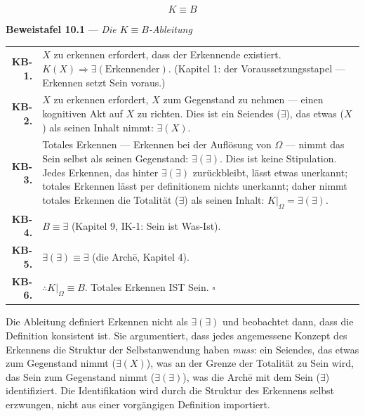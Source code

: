 \documentclass[10pt, openany, oneside]{book}
\renewcommand{\footnotesize}{\fontsize{8.5}{11}\selectfont}
\begin{document}
$$\boxed{K \equiv B}$$

\vspace{0.5em}

\textbf{Beweistafel 10.1} --- \textit{Die $K \equiv B$-Ableitung}

\vspace{0.5em}

{\footnotesize
\noindent\begin{tabular}{r p{}}
\textbf{KB-1.} & $X$ zu erkennen erfordert, dass der Erkennende existiert. $K(X) \Rightarrow \exists(\text{Erkennender})$. (Kapitel 1: der Voraussetzungsstapel --- Erkennen setzt Sein voraus.) \\[0.3em]
\textbf{KB-2.} & $X$ zu erkennen erfordert, $X$ zum Gegenstand zu nehmen --- einen kognitiven Akt auf $X$ zu richten. Dies ist ein Seiendes ($\exists$), das etwas ($X$) als seinen Inhalt nimmt: $\exists(X)$. \\[0.3em]
\textbf{KB-3.} & Totales Erkennen --- Erkennen bei der Auflösung von $\Omega$ --- nimmt das Sein selbst als seinen Gegenstand: $\exists(\exists)$. Dies ist keine Stipulation. Jedes Erkennen, das hinter $\exists(\exists)$ zurückbleibt, lässt etwas unerkannt; totales Erkennen lässt per definitionem nichts unerkannt; daher nimmt totales Erkennen die Totalität ($\exists$) als seinen Inhalt: $K|_{\Omega} = \exists(\exists)$. \\[0.3em]
\textbf{KB-4.} & $B \equiv \exists$ (Kapitel 9, IK-1: Sein ist Was-Ist). \\[0.3em]
\textbf{KB-5.} & $\exists(\exists) \equiv \exists$ (die Arch\={e}, Kapitel 4). \\[0.3em]
\textbf{KB-6.} & $\therefore K|_{\Omega} \equiv B$. Totales Erkennen IST Sein. $\square$ \\[0.3em]
\end{tabular}
}

\vspace{0.8em}

\noindent Die Ableitung definiert Erkennen nicht als $\exists(\exists)$ und beobachtet dann, dass die Definition konsistent ist. Sie argumentiert, dass jedes angemessene Konzept des Erkennens die Struktur der Selbstanwendung haben \textit{muss}: ein Seiendes, das etwas zum Gegenstand nimmt ($\exists(X)$), was an der Grenze der Totalität zu Sein wird, das Sein zum Gegenstand nimmt ($\exists(\exists)$), was die Arch\={e} mit dem Sein ($\exists$) identifiziert. Die Identifikation wird durch die Struktur des Erkennens selbst erzwungen, nicht aus einer vorgängigen Definition importiert.
\end{document}
